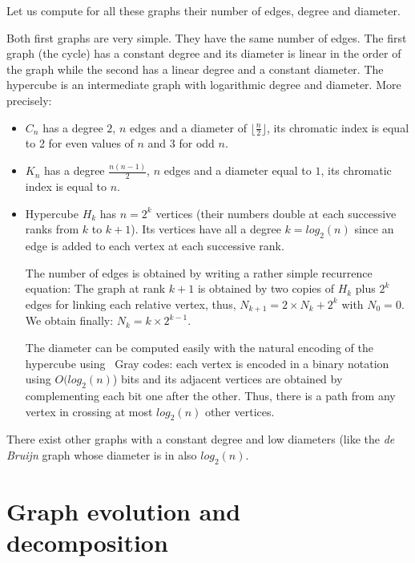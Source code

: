Let us compute for all these graphs their number of edges, degree and diameter.

Both first graphs are very simple. 
They have the same number of edges. 
The first graph (the cycle) has a constant degree and its diameter is linear in the order of the graph while the second has 
a linear degree and a constant diameter. The hypercube is an intermediate graph with logarithmic degree and diameter.
More precisely:

\begin{itemize}
\item
$C_n$ has a degree $2$, $n$ edges and a diameter of $\lfloor \frac{n}{2} \rfloor$, its chromatic index is equal to 2 for even values of $n$ and $3$ for odd $n$.
\item
$K_n$ has a degree $\frac{n(n-1)}{2}$, $n$ edges and a diameter equal to $1$, its chromatic index is equal to $n$. 
\item
Hypercube $H_k$ has $n=2^k$ vertices (their numbers double at each successive ranks from $k$ to $k+1$).
Its vertices have all a degree $k=log_2(n)$ since an edge is added to each vertex at each successive rank.

The number of edges is obtained by writing a rather simple recurrence equation: The graph at rank $k+1$ is obtained by two copies of $H_k$
plus $2^k$ edges for linking each relative vertex, thus,
$N_{k+1} = 2 \times N_k + 2^k$ with $N_0 = 0$.
We obtain finally: $N_k = k \times 2^{k-1}$. 

The diameter can be computed easily with the natural encoding of the hypercube using {\ Gray} codes:
each vertex is encoded in a binary notation using $O(log_2(n)$) bits and its adjacent vertices are obtained by complementing each bit one after the other.
Thus, there is a path from any vertex in crossing at most $log_2(n)$ other vertices.
\end{itemize}

There exist other graphs with a constant degree and low diameters (like the {\it de Bruijn} graph whose diameter is in also $log_2(n)$. 





\section{Graph evolution and decomposition}

